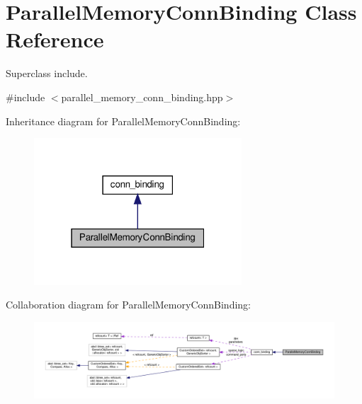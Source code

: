 \hypertarget{classParallelMemoryConnBinding}{}\section{Parallel\+Memory\+Conn\+Binding Class Reference}
\label{classParallelMemoryConnBinding}


Superclass include.  




{\ttfamily \#include $<$parallel\+\_\+memory\+\_\+conn\+\_\+binding.\+hpp$>$}



Inheritance diagram for Parallel\+Memory\+Conn\+Binding\+:
\nopagebreak
\begin{figure}[H]
\begin{center}
\leavevmode
\includegraphics[width=220pt]{d7/d18/classParallelMemoryConnBinding__inherit__graph}
\end{center}
\end{figure}


Collaboration diagram for Parallel\+Memory\+Conn\+Binding\+:
\nopagebreak
\begin{figure}[H]
\begin{center}
\leavevmode
\includegraphics[width=350pt]{d4/d1d/classParallelMemoryConnBinding__coll__graph}
\end{center}
\end{figure}
